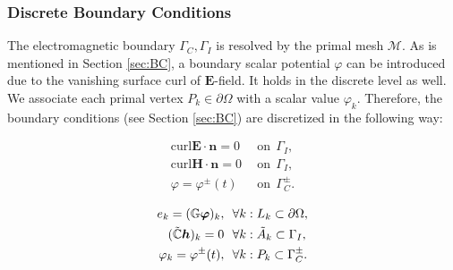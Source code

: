 \documentclass{article}
\begin{document}
\subsubsection{Discrete Boundary Conditions}
The electromagnetic boundary $\Gamma_C, \Gamma_I$ is resolved by the primal mesh $\mathcal{M}$. As is mentioned in Section \ref{sec:BC}, a boundary scalar potential $\varphi$ can be introduced due to the vanishing surface curl of $\mathbf{E}$-field. It holds in the discrete level as well. We associate each primal vertex $P_k \in \partial\Omega$ with a scalar value $\varphi_k$. Therefore, the boundary conditions (see Section \ref{sec:BC}) are discretized in the following way:
\begin{center}
    \vspace{-0.5cm}
    \begin{minipage}{0.3\textwidth}
    \begin{align*}
    \text{curl} \mathbf{E} \cdot \mathbf{n} = 0\ \ &\text{on} \ \  \Gamma_I,  \\
    \text{curl} \mathbf{H} \cdot \mathbf{n} = 0\ \  &\text{on} \ \  \Gamma_I, \\
    \varphi = \varphi^\pm(t)\ \ &\text{on} \ \ \Gamma_C^\pm.
    \end{align*}
    \end{minipage}
    \begin{minipage}{0.1\textwidth}
    \centering
    \end{minipage}
    \begin{minipage}{0.4\textwidth}
        \begin{subequations}
            \begin{align}
            e_k = (\mathbb{G}\bm{\varphi})_k,\ \ &\forall k : L_k \subset \partial\Omega, \label{equ:bc_2}\\
            (\Tilde{\mathbb{C}} \bm{h})_k = 0\ \ &\forall k : \Tilde{A}_k \subset \Gamma_I,\label{equ:bc_3} \\
            \varphi_k = \varphi^\pm(t), \ \ &\forall k : P_k \subset \Gamma_C^\pm. \label{equ:bc_1}
            \end{align}
        \end{subequations}
    \end{minipage}
\end{center}
\end{document}
